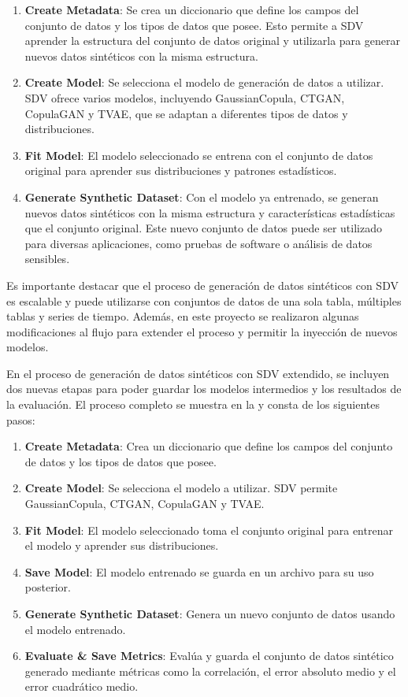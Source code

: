 \begin{enumerate}
    \item \textbf{Create Metadata}: Se crea un diccionario que define los campos del conjunto de datos y los tipos de datos que posee. Esto permite a SDV aprender la estructura del conjunto de datos original y utilizarla para generar nuevos datos sintéticos con la misma estructura.
    \item \textbf{Create Model}: Se selecciona el modelo de generación de datos a utilizar. SDV ofrece varios modelos, incluyendo GaussianCopula, CTGAN, CopulaGAN y TVAE, que se adaptan a diferentes tipos de datos y distribuciones.
    \item \textbf{Fit Model}: El modelo seleccionado se entrena con el conjunto de datos original para aprender sus distribuciones y patrones estadísticos.
    \item \textbf{Generate Synthetic Dataset}: Con el modelo ya entrenado, se generan nuevos datos sintéticos con la misma estructura y características estadísticas que el conjunto original. Este nuevo conjunto de datos puede ser utilizado para diversas aplicaciones, como pruebas de software o análisis de datos sensibles.
\end{enumerate}

Es importante destacar que el proceso de generación de datos sintéticos con SDV es escalable y puede utilizarse con conjuntos de datos de una sola tabla, múltiples tablas y series de tiempo. Además, en este proyecto se realizaron algunas modificaciones al flujo para extender el proceso y permitir la inyección de nuevos modelos.
    
\newpage
En el proceso de generación de datos sintéticos con SDV extendido, se incluyen dos nuevas etapas para poder guardar los modelos intermedios y los resultados de la evaluación. El proceso completo se muestra en la  y consta de los siguientes pasos:

\begin{enumerate}
    \item \textbf{Create Metadata}: Crea un diccionario que define los campos del conjunto de datos y los tipos de datos que posee.
    \item \textbf{Create Model}: Se selecciona el modelo a utilizar. SDV permite GaussianCopula, CTGAN, CopulaGAN y TVAE.
    \item \textbf{Fit Model}: El modelo seleccionado toma el conjunto original para entrenar el modelo y aprender sus distribuciones.
    \item \textbf{Save Model}: El modelo entrenado se guarda en un archivo para su uso posterior.
    \item \textbf{Generate Synthetic Dataset}: Genera un nuevo conjunto de datos usando el modelo entrenado.
    \item \textbf{Evaluate \& Save Metrics}: Evalúa y guarda el conjunto de datos sintético generado mediante métricas como la correlación, el error absoluto medio y el error cuadrático medio.
\end{enumerate}



